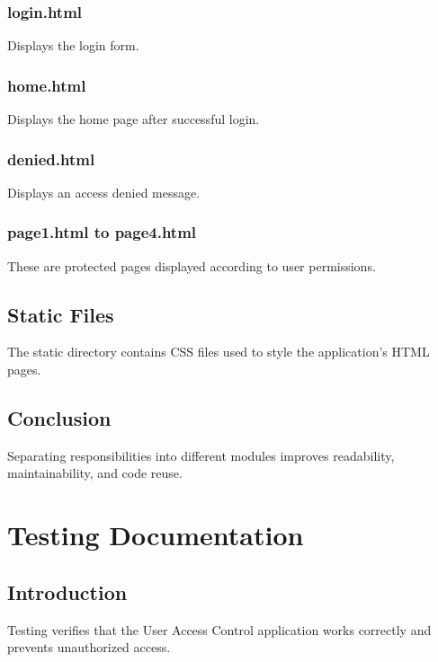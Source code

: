 \documentclass[letterpaper,10pt,english]{sphinxmanual}
\begin{document}
\subsubsection{login.html}
\label{\detokenize{modules:login-html}}
\sphinxAtStartPar
Displays the login form.


\subsubsection{home.html}
\label{\detokenize{modules:home-html}}
\sphinxAtStartPar
Displays the home page after successful login.


\subsubsection{denied.html}
\label{\detokenize{modules:denied-html}}
\sphinxAtStartPar
Displays an access denied message.


\subsubsection{page1.html to page4.html}
\label{\detokenize{modules:page1-html-to-page4-html}}
\sphinxAtStartPar
These are protected pages displayed according to user permissions.


\subsection{Static Files}
\label{\detokenize{modules:static-files}}
\sphinxAtStartPar
The static directory contains CSS files used to style the application’s
HTML pages.


\subsection{Conclusion}
\label{\detokenize{modules:conclusion}}
\sphinxAtStartPar
Separating responsibilities into different modules improves readability,
maintainability, and code reuse.

\sphinxstepscope


\section{Testing Documentation}
\label{\detokenize{testing:testing-documentation}}\label{\detokenize{testing::doc}}

\subsection{Introduction}
\label{\detokenize{testing:introduction}}
\sphinxAtStartPar
Testing verifies that the User Access Control application works correctly
and prevents unauthorized access.
\end{document}
